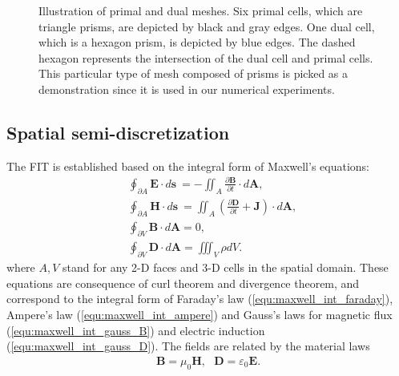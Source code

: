 \documentclass{report}
\begin{document}
\begin{figure}
    \caption{Illustration of primal and dual meshes. Six primal cells, which are triangle prisms, are depicted by black and gray edges. One dual cell, which is a hexagon prism, is depicted by blue edges. The dashed hexagon represents the intersection of the dual cell and primal cells. This particular type of mesh composed of prisms is picked as a demonstration since it is used in our numerical experiments.}
    \label{fig:illustration_primal_dual}
\end{figure}
\subsection{Spatial semi-discretization} \label{sec:fit}
The FIT is established based on the integral form of Maxwell's equations:
\begin{align}
    &\oint_{\partial A} \mathbf{E} \cdot d\mathbf{s} \ = - \iint_A \frac{\partial \mathbf{B}}{\partial t} \cdot d\mathbf{A}, \label{equ:maxwell_int_faraday}\\
    &\oint_{\partial A} \mathbf{H} \cdot d\mathbf{s} \ = \iint_A \left(\frac{\partial \mathbf{D}}{\partial t} + \mathbf{J}\right) \cdot d\mathbf{A}, \label{equ:maxwell_int_ampere}\\
    &\oint_{\partial V} \mathbf{B} \cdot d\mathbf{A} = 0, \label{equ:maxwell_int_gauss_B}\\
    &\oint_{\partial V} \mathbf{D} \cdot d\mathbf{A} = \iiint_V \rho dV. \label{equ:maxwell_int_gauss_D}
\end{align}
where $A, V$ stand for any 2-D faces and 3-D cells in the spatial domain. These equations are consequence of curl theorem and divergence theorem, and correspond to the integral form of Faraday's law (\ref{equ:maxwell_int_faraday}), Ampere's law (\ref{equ:maxwell_int_ampere}) and Gauss's laws for magnetic flux (\ref{equ:maxwell_int_gauss_B}) and electric induction (\ref{equ:maxwell_int_gauss_D}). The fields are related by the material laws
\begin{align} \label{equ:maxwell_material_laws}
    \mathbf{B} = \mu_0 \mathbf{H},\ \ \ \mathbf{D} = \varepsilon_0 \mathbf{E}.
\end{align}
\end{document}
